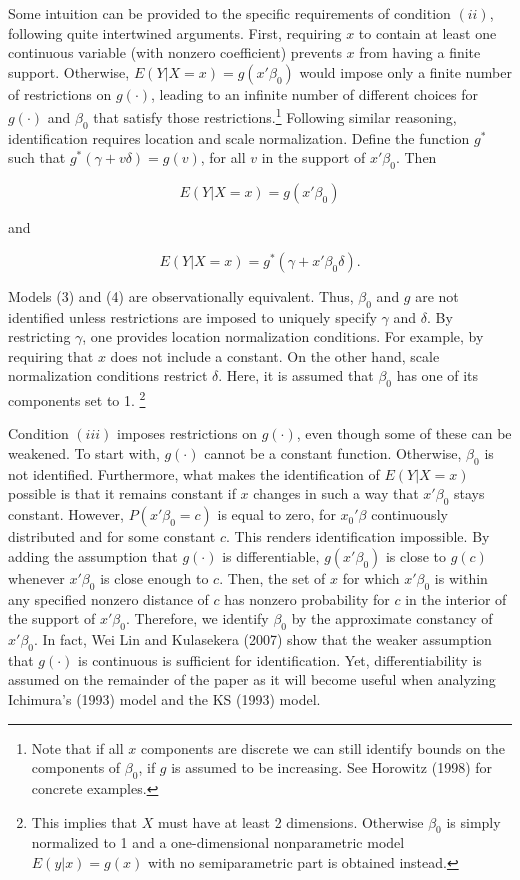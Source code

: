 \documentclass[a4paper]{article}
\begin{document}
Some intuition can be provided to the specific requirements of condition $(ii)$, following quite intertwined arguments. First, requiring $x$ to contain at least one continuous variable (with nonzero coefficient) prevents $x$ from having a finite support. Otherwise, $E(Y|X = x) = g(x'\beta_0)$ would impose only a finite number of restrictions on $g(\cdot)$, leading to an infinite number of different choices for $g(\cdot)$ and $\beta_0$ that satisfy those restrictions.\footnote{Note that if all $x$ components are discrete we can still identify bounds on the components of $\beta_0$, if $g$ is assumed to be increasing. See Horowitz (1998) \cite{[13]} for  concrete examples.} Following similar reasoning, identification requires location and scale normalization. Define the function $g^{*}$ such that $g^{*}(\gamma + v\delta) = g(v)$, for all $v$ in the support of $x'\beta_0$. Then

\begin{equation}
E(Y|X = x) = g(x'\beta_0)
\end{equation}

and

\begin{equation}
E(Y|X = x) = g^*(\gamma + x'\beta_0\delta).
\end{equation}

Models (3) and (4) are observationally equivalent. Thus, $\beta_0$ and $g$ are not identified unless restrictions are imposed to uniquely specify $\gamma$ and $\delta$. By restricting $\gamma$, one provides location normalization conditions. For example, by requiring that $x$ does not include a constant. On the other hand, scale normalization conditions restrict $\delta$. Here, it is assumed that $\beta_0$ has one of its components set to 1. \footnote{This implies that $X$ must have at least 2 dimensions. Otherwise $\beta_0$ is simply normalized to 1 and a one-dimensional nonparametric model $E(y|x) = g(x)$ with no semiparametric part is obtained instead.}

Condition $(iii)$ imposes restrictions on $g(\cdot)$, even though some of these can be weakened. To start with, $g(\cdot)$ cannot be a constant function. Otherwise, $\beta_0$ is not identified. Furthermore, what makes the identification of $E(Y|X = x)$ possible is that it remains constant if $x$ changes in such a way that $x'\beta_0$ stays constant. However, $P(x'\beta_0 = c)$ is equal to zero, for $x_0'\beta$ continuously distributed and for some constant $c$. This renders identification impossible. By adding the assumption that $g(\cdot)$ is differentiable, $g(x'\beta_0)$ is close to $g(c)$ whenever $x'\beta_0$ is close enough to $c$. Then, the set of $x$ for which $x'\beta_0$ is within any specified nonzero distance of $c$ has nonzero probability for $c$ in the interior of the support of $x'\beta_0$. Therefore, we identify $\beta_0$ by the approximate constancy of $x'\beta_0$. In fact, Wei Lin and Kulasekera (2007) \cite{[14]} show that the weaker assumption that $g(\cdot)$ is continuous is sufficient for identification. Yet, differentiability is assumed on the remainder of the paper as it will become useful when analyzing Ichimura's (1993) \cite{[6]} model and the KS (1993) \cite{[12]} model.
\end{document}
